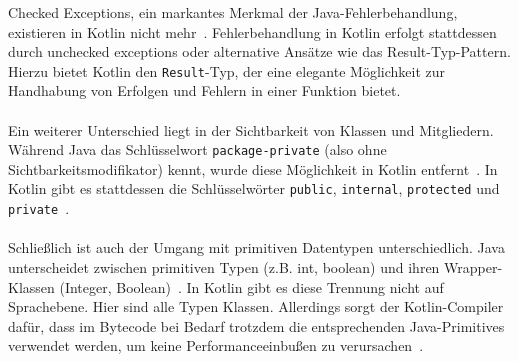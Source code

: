 \documentclass[11pt]{article}
\begin{document}
    Checked Exceptions, ein markantes Merkmal der Java-Fehlerbehandlung, existieren in Kotlin nicht mehr~\cite{doc-comparison}.
    Fehlerbehandlung in Kotlin erfolgt stattdessen durch unchecked exceptions oder alternative Ansätze wie das Result-Typ-Pattern.
    Hierzu bietet Kotlin den \texttt{Result}-Typ, der eine elegante Möglichkeit zur Handhabung von Erfolgen und Fehlern in einer Funktion bietet.\\
    \\
    Ein weiterer Unterschied liegt in der Sichtbarkeit von Klassen und Mitgliedern.
    Während Java das Schlüsselwort \texttt{package-private} (also ohne Sichtbarkeitsmodifikator) kennt, wurde diese Möglichkeit in Kotlin entfernt~\cite{doc-comparison}.
    In Kotlin gibt es stattdessen die Schlüsselwörter \texttt{public}, \texttt{internal}, \texttt{protected} und \texttt{private}~\cite{kotlin-visibility}.\\
    \\
    Schließlich ist auch der Umgang mit primitiven Datentypen unterschiedlich.
    Java unterscheidet zwischen primitiven Typen (z.B. int, boolean) und ihren Wrapper-Klassen (Integer, Boolean)~\cite{java-autobox}.
    In Kotlin gibt es diese Trennung nicht auf Sprachebene.
    Hier sind alle Typen Klassen.
    Allerdings sorgt der Kotlin-Compiler dafür, dass im Bytecode bei Bedarf trotzdem die entsprechenden Java-Primitives verwendet werden, um keine Performanceeinbußen zu verursachen~\cite{kotlin-types}.
\end{document}
